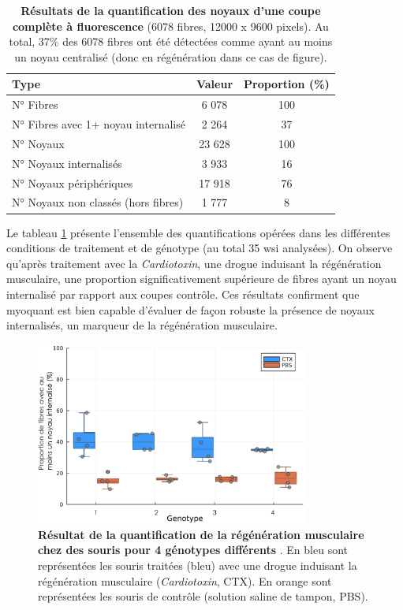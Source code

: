 \begin{table}[!ht]
\centering
\caption[Résultats de la quantification des noyaux d'une coupe complète à fluorescence]{\textbf{Résultats de la quantification des noyaux d'une coupe complète à fluorescence} (6078 fibres, 12000 x 9600 pixels). Au total, 37\% des 6078 fibres ont été détectées comme ayant au moins un noyau centralisé (donc en régénération dans ce cas de figure).}
\label{tab:myoquant_fluo_results}
\begin{tabular}{|l|c|c|}
\hline
\textbf{Type} & \textbf{Valeur} & \textbf{Proportion (\%)} \\
\hline
N° Fibres & 6 078 & 100 \\
\hline
N° Fibres avec 1+ noyau internalisé & 2 264 & 37 \\
\hline
\hline
N° Noyaux & 23 628 & 100 \\
\hline
N° Noyaux internalisés & 3 933 & 16 \\
\hline
N° Noyaux périphériques & 17 918 & 76 \\
\hline
N° Noyaux non classés (hors fibres) & 1 777 & 8 \\
\hline
\end{tabular}
\end{table}
Le tableau \ref{fig:fluo_compil} présente l'ensemble des quantifications opérées dans les différentes conditions de traitement et de génotype (au total 35 \gls{wsi} analysées). On observe qu'après traitement avec la \textit{Cardiotoxin}, une drogue induisant la régénération musculaire, une proportion significativement supérieure de fibres ayant un noyau internalisé par rapport aux coupes contrôle. Ces résultats confirment que \gls{myoquant} est bien capable d'évaluer de façon robuste la présence de noyaux internalisés, un marqueur de la régénération musculaire.

\begin{figure}[!ht]
 \centering
 \includegraphics[width=0.8\textwidth]{figures/fluo_compil.png}
 \caption[Résultat de la quantification de la régénération musculaire]{\textbf{Résultat de la quantification de la régénération musculaire chez des souris pour 4 génotypes différents }. En bleu sont représentées les souris traitées (bleu) avec une drogue induisant la régénération musculaire (\textit{Cardiotoxin}, CTX). En orange sont représentées les souris de contrôle (solution saline de tampon, PBS).}
 \label{fig:fluo_compil}
\end{figure}

